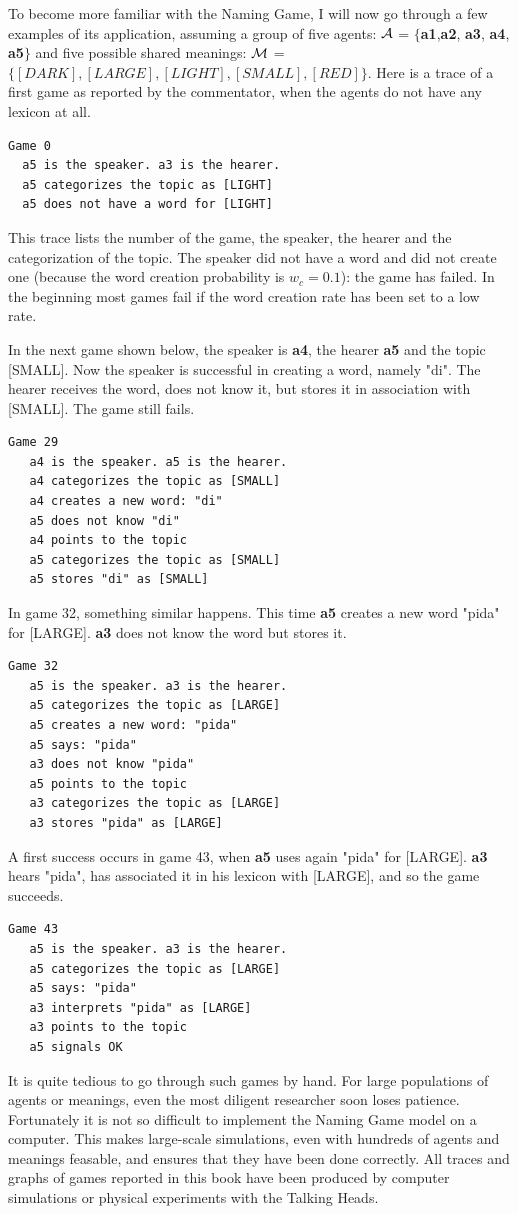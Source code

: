 To become more familiar with the Naming Game, I will now 
go through a few examples of its application, assuming 
a group of five agents: ${\cal A}$ = $\{${\bf a1},{\bf a2},
{\bf a3}, {\bf a4}, {\bf a5}$\}$ and five possible shared meanings: 
\newline 
${\cal M}$ = $\{[DARK],[LARGE],[LIGHT],[SMALL],[RED]\}$. 
\newline
Here is a trace of a first game as reported by 
the commentator, when the agents do not have any lexicon at
all. 
\begin{verbatim}
Game 0 
  a5 is the speaker. a3 is the hearer. 
  a5 categorizes the topic as [LIGHT]
  a5 does not have a word for [LIGHT]
\end{verbatim}
This trace lists the number of the game, the speaker, the 
hearer and the categorization of
the topic. The speaker did not have a word and did not 
create one (because the word creation probability is 
$w_{c}=0.1$): the game has failed. In the beginning 
most games fail if the word creation rate has been set to a low rate.

In the next game shown below, the speaker is 
{\bf a4}, the hearer {\bf a5} and the topic
[SMALL]. Now the speaker is successful in creating a word, namely 
"di". The hearer receives the word, does not know it,
but stores it in association with [SMALL]. The game still fails. 
\begin{verbatim}
Game 29
   a4 is the speaker. a5 is the hearer. 
   a4 categorizes the topic as [SMALL]
   a4 creates a new word: "di"
   a5 does not know "di"
   a4 points to the topic
   a5 categorizes the topic as [SMALL]
   a5 stores "di" as [SMALL]
\end{verbatim}
In game 32, something similar happens. This time {\bf a5} creates
a new word "pida" for [LARGE]. {\bf a3} does not know 
the word but stores it. 
\begin{verbatim}
Game 32
   a5 is the speaker. a3 is the hearer. 
   a5 categorizes the topic as [LARGE]
   a5 creates a new word: "pida"
   a5 says: "pida"
   a3 does not know "pida"
   a5 points to the topic
   a3 categorizes the topic as [LARGE]
   a3 stores "pida" as [LARGE]
\end{verbatim}
A first success occurs in game 43, when {\bf a5} uses again 
"pida" for [LARGE]. {\bf a3} hears "pida", has associated it 
in his lexicon with [LARGE], and so the game succeeds. 
\begin{verbatim}
Game 43
   a5 is the speaker. a3 is the hearer. 
   a5 categorizes the topic as [LARGE]
   a5 says: "pida"
   a3 interprets "pida" as [LARGE]
   a3 points to the topic 
   a5 signals OK
\end{verbatim}
It is quite tedious to go through such games by hand. 
For large populations of agents or meanings, even the 
most diligent researcher soon loses patience. Fortunately 
it is not so difficult to implement the Naming Game model on 
a computer. This makes large-scale simulations, even with 
hundreds of agents and meanings feasable, and ensures
that they have been done correctly.
All traces and graphs of games reported in this book
have been produced by computer simulations or physical 
experiments with the Talking Heads. 

